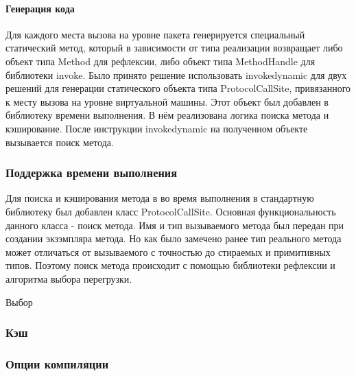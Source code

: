\paragraph{Генерация кода}
Для каждого места вызова на уровне пакета генерируется специальный статический метод, который в зависимости от типа реализации возвращает либо объект типа Method для рефлексии, либо объект типа MethodHandle для библиотеки invoke. Было принято решение использовать invokedynamic для двух решений для генерации статического объекта типа ProtocolCallSite, привязанного к месту вызова на уровне виртуальной машины. Этот объект был добавлен в библиотеку времени выполнения. В нём реализована логика поиска метода и кэширование. После инструкции invokedynamic на полученном объекте вызывается поиск метода.

\subsubsection{Поддержка времени выполнения}
Для поиска и кэширования метода в во время выполнения в стандартную библиотеку был добавлен класс ProtocolCallSite. Основная функциональность данного класса - поиск метода. Имя и тип вызываемого метода был передан при создании экзэмпляра метода. Но как было замечено ранее тип реального метода может отличаться от вызываемого с точностью до стираемых и примитивных типов. Поэтому поиск метода происходит с помощью библиотеки рефлексии и алгоритма выбора перегрузки.

Выбор

\subsubsection{Кэш}

\subsubsection{Опции компиляции}
%




